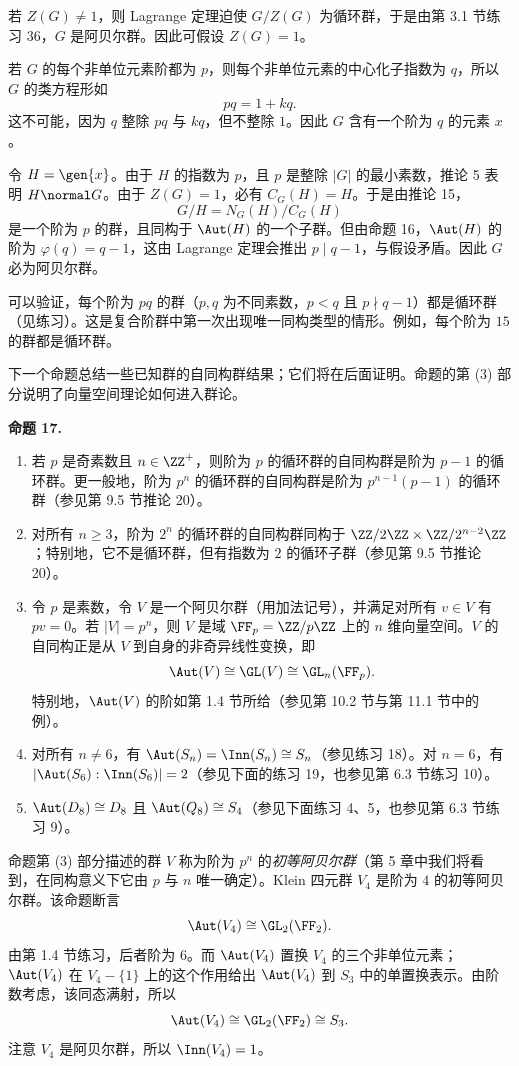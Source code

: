 若 $Z(G)\neq1$，则 Lagrange 定理迫使 $G/Z(G)$ 为循环群，于是由第 3.1 节练习 36，$G$ 是阿贝尔群。因此可假设 $Z(G)=1$。

若 $G$ 的每个非单位元素阶都为 $p$，则每个非单位元素的中心化子指数为 $q$，所以 $G$ 的类方程形如
\[
  pq=1+kq.
\]
这不可能，因为 $q$ 整除 $pq$ 与 $kq$，但不整除 $1$。因此 $G$ 含有一个阶为 $q$ 的元素 $x$。

令 $H=\gen{x}$。由于 $H$ 的指数为 $p$，且 $p$ 是整除 $|G|$ 的最小素数，推论 5 表明 $H\normal G$。由于 $Z(G)=1$，必有 $C_G(H)=H$。于是由推论 15，
\[
  G/H=N_G(H)/C_G(H)
\]
是一个阶为 $p$ 的群，且同构于 $\Aut(H)$ 的一个子群。但由命题 16，$\Aut(H)$ 的阶为 $\varphi(q)=q-1$，这由 Lagrange 定理会推出 $p\mid q-1$，与假设矛盾。因此 $G$ 必为阿贝尔群。

可以验证，每个阶为 $pq$ 的群（$p,q$ 为不同素数，$p<q$ 且 $p\nmid q-1$）都是循环群（见练习）。这是复合阶群中第一次出现唯一同构类型的情形。例如，每个阶为 $15$ 的群都是循环群。

下一个命题总结一些已知群的自同构群结果；它们将在后面证明。命题的第 (3) 部分说明了向量空间理论如何进入群论。

\medskip
\noindent\textbf{命题 17.}
\begin{enumerate}[label=(\arabic*)]
  \item 若 $p$ 是奇素数且 $n\in\ZZ^+$，则阶为 $p$ 的循环群的自同构群是阶为 $p-1$ 的循环群。更一般地，阶为 $p^n$ 的循环群的自同构群是阶为 $p^{n-1}(p-1)$ 的循环群（参见第 9.5 节推论 20）。
  \item 对所有 $n\geq3$，阶为 $2^n$ 的循环群的自同构群同构于 $\ZZ/2\ZZ\times\ZZ/2^{n-2}\ZZ$；特别地，它不是循环群，但有指数为 $2$ 的循环子群（参见第 9.5 节推论 20）。
  \item 令 $p$ 是素数，令 $V$ 是一个阿贝尔群（用加法记号），并满足对所有 $v\in V$ 有 $pv=0$。若 $|V|=p^n$，则 $V$ 是域 $\FF_p=\ZZ/p\ZZ$ 上的 $n$ 维向量空间。$V$ 的自同构正是从 $V$ 到自身的非奇异线性变换，即
  \[
    \Aut(V)\cong\GL(V)\cong\GL_n(\FF_p).
  \]
  特别地，$\Aut(V)$ 的阶如第 1.4 节所给（参见第 10.2 节与第 11.1 节中的例）。
  \item 对所有 $n\neq6$，有 $\Aut(S_n)=\Inn(S_n)\cong S_n$（参见练习 18）。对 $n=6$，有 $|\Aut(S_6):\Inn(S_6)|=2$（参见下面的练习 19，也参见第 6.3 节练习 10）。
  \item $\Aut(D_8)\cong D_8$ 且 $\Aut(Q_8)\cong S_4$（参见下面练习 4、5，也参见第 6.3 节练习 9）。
\end{enumerate}

命题第 (3) 部分描述的群 $V$ 称为阶为 $p^n$ 的\emph{初等阿贝尔群}（第 5 章中我们将看到，在同构意义下它由 $p$ 与 $n$ 唯一确定）。Klein 四元群 $V_4$ 是阶为 $4$ 的初等阿贝尔群。该命题断言
\[
  \Aut(V_4)\cong\GL_2(\FF_2).
\]
由第 1.4 节练习，后者阶为 $6$。而 $\Aut(V_4)$ 置换 $V_4$ 的三个非单位元素；$\Aut(V_4)$ 在 $V_4-\{1\}$ 上的这个作用给出 $\Aut(V_4)$ 到 $S_3$ 中的单置换表示。由阶数考虑，该同态满射，所以
\[
  \Aut(V_4)\cong\GL_2(\FF_2)\cong S_3.
\]
注意 $V_4$ 是阿贝尔群，所以 $\Inn(V_4)=1$。


